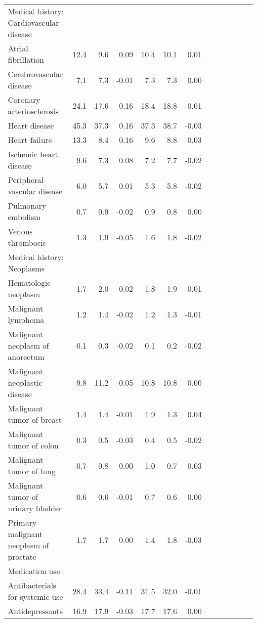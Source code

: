\documentclass[11pt,]{article}
\begin{document}
\begin{longtable}{lrrrrrrrrrrrr}
  Medical history: Cardiovascular disease &    &    &     &    &    &     \\ 
      Atrial fibrillation & 12.4 &  9.6 &  0.09 & 10.4 & 10.1 &  0.01 \\ 
      Cerebrovascular disease &  7.1 &  7.3 & -0.01 &  7.3 &  7.3 &  0.00 \\ 
      Coronary arteriosclerosis & 24.1 & 17.6 &  0.16 & 18.4 & 18.8 & -0.01 \\ 
      Heart disease & 45.3 & 37.3 &  0.16 & 37.3 & 38.7 & -0.03 \\ 
      Heart failure & 13.3 &  8.4 &  0.16 &  9.6 &  8.8 &  0.03 \\ 
      Ischemic heart disease &  9.6 &  7.3 &  0.08 &  7.2 &  7.7 & -0.02 \\ 
      Peripheral vascular disease &  6.0 &  5.7 &  0.01 &  5.3 &  5.8 & -0.02 \\ 
      Pulmonary embolism &  0.7 &  0.9 & -0.02 &  0.9 &  0.8 &  0.00 \\ 
      Venous thrombosis &  1.3 &  1.9 & -0.05 &  1.6 &  1.8 & -0.02 \\ 
  Medical history: Neoplasms &    &    &     &    &    &     \\ 
      Hematologic neoplasm &  1.7 &  2.0 & -0.02 &  1.8 &  1.9 & -0.01 \\ 
      Malignant lymphoma &  1.2 &  1.4 & -0.02 &  1.2 &  1.3 & -0.01 \\ 
      Malignant neoplasm of anorectum &  0.1 &  0.3 & -0.02 &  0.1 &  0.2 & -0.02 \\ 
      Malignant neoplastic disease &  9.8 & 11.2 & -0.05 & 10.8 & 10.8 &  0.00 \\ 
      Malignant tumor of breast &  1.4 &  1.4 & -0.01 &  1.9 &  1.3 &  0.04 \\ 
      Malignant tumor of colon &  0.3 &  0.5 & -0.03 &  0.4 &  0.5 & -0.02 \\ 
      Malignant tumor of lung &  0.7 &  0.8 &  0.00 &  1.0 &  0.7 &  0.03 \\ 
      Malignant tumor of urinary bladder &  0.6 &  0.6 & -0.01 &  0.7 &  0.6 &  0.00 \\ 
      Primary malignant neoplasm of prostate &  1.7 &  1.7 &  0.00 &  1.4 &  1.8 & -0.03 \\ 
  Medication use &    &    &     &    &    &     \\ 
      Antibacterials for systemic use & 28.4 & 33.4 & -0.11 & 31.5 & 32.0 & -0.01 \\ 
      Antidepressants & 16.9 & 17.9 & -0.03 & 17.7 & 17.6 &  0.00 \\ 

\end{longtable}
\end{document}
